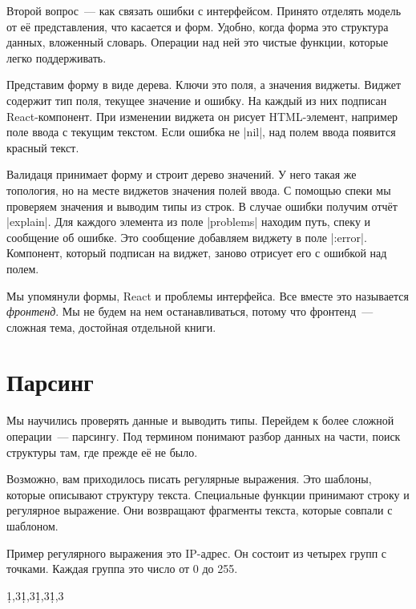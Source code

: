 Второй вопрос~--- как связать ошибки с интерфейсом. Принято отделять модель от
е\"{е} представления, что касается и форм. Удобно, когда форма это структура данных,
вложенный словарь. Операции над ней это чистые функции, которые легко
поддерживать.

Представим форму в виде дерева. Ключи это поля, а значения виджеты. Виджет
содержит тип поля, текущее значение и ошибку. На каждый из них подписан
React-компонент. При изменении виджета он рисует HTML-элемент, например поле
ввода с текущим текстом. Если ошибка не \spverb|nil|, над полем ввода появится
красный текст.

Валидаця принимает форму и строит дерево значений. У него такая же топология, но
на месте виджетов значения полей ввода. С помощью спеки мы проверяем значения и
выводим типы из строк. В случае ошибки получим отч\"{е}т \spverb|explain|. Для
каждого элемента из поле \spverb|problems| находим путь, спеку и сообщение об
ошибке. Это сообщение добавляем виджету в поле \spverb|:error|. Компонент,
который подписан на виджет, заново отрисует его с ошибкой над полем.


Мы упомянули формы, React и проблемы интерфейса. Все вместе это называется
\emph{фронтенд}. Мы не будем на нем останавливаться, потому что фронтенд~---
сложная тема, достойная отдельной книги.

\section{Парсинг}

Мы научились проверять данные и выводить типы. Перейдем к более сложной
операции~--- парсингу. Под термином понимают разбор данных на части, поиск
структуры там, где прежде е\"{е} не было.

Возможно, вам приходилось писать регулярные выражения. Это шаблоны, которые
описывают структуру текста. Специальные функции принимают строку и регулярное
выражение. Они возвращают фрагменты текста, которые совпали с шаблоном.

Пример регулярного выражения это IP-адрес. Он состоит из четырех групп с
точками. Каждая группа это число от 0 до 255.


\begin{english}
  \begin{text}
\d{1,3}\.\d{1,3}\.\d{1,3}\.\d{1,3}
  \end{text}
\end{english}

